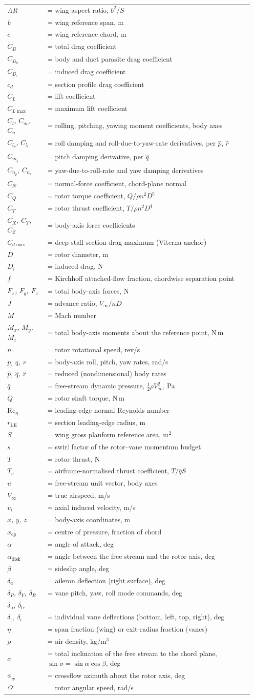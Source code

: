 \documentclass[11pt,a4paper]{article}
\newcommand{\nomen}[2]{\textit{#1} & \quad #2 \\}
\begin{document}
\begin{longtable}{@{}p{28mm}@{}p{112mm}@{}}
\nomen{A\!R}{= wing aspect ratio, $b^2/S$}
\nomen{b}{= wing reference span, m}
\nomen{$\bar c$}{= wing reference chord, m}
\nomen{$C_D$}{= total drag coefficient}
\nomen{$C_{D_0}$}{= body and duct parasite drag coefficient}
\nomen{$C_{D_i}$}{= induced drag coefficient}
\nomen{$c_d$}{= section profile drag coefficient}
\nomen{$C_L$}{= lift coefficient}
\nomen{$C_{L\max}$}{= maximum lift coefficient}
\nomen{$C_l$, $C_m$, $C_n$}{= rolling, pitching, yawing moment coefficients, body axes}
\nomen{$C_{l_p}$, $C_{l_r}$}{= roll damping and roll-due-to-yaw-rate derivatives, per $\hat p$, $\hat r$}
\nomen{$C_{m_q}$}{= pitch damping derivative, per $\hat q$}
\nomen{$C_{n_p}$, $C_{n_r}$}{= yaw-due-to-roll-rate and yaw damping derivatives}
\nomen{$C_N$}{= normal-force coefficient, chord-plane normal}
\nomen{$C_Q$}{= rotor torque coefficient, $Q/\rho n^2 D^5$}
\nomen{$C_T$}{= rotor thrust coefficient, $T/\rho n^2 D^4$}
\nomen{$C_X$, $C_Y$, $C_Z$}{= body-axis force coefficients}
\nomen{$C_{d\max}$}{= deep-stall section drag maximum (Viterna anchor)}
\nomen{$D$}{= rotor diameter, m}
\nomen{$D_i$}{= induced drag, N}
\nomen{$f$}{= Kirchhoff attached-flow fraction, chordwise separation point}
\nomen{$F_x$, $F_y$, $F_z$}{= total body-axis forces, N}
\nomen{$J$}{= advance ratio, $V_\infty/nD$}
\nomen{$M$}{= Mach number}
\nomen{$M_x$, $M_y$, $M_z$}{= total body-axis moments about the reference point, N\,m}
\nomen{$n$}{= rotor rotational speed, rev/s}
\nomen{$p$, $q$, $r$}{= body-axis roll, pitch, yaw rates, rad/s}
\nomen{$\hat p$, $\hat q$, $\hat r$}{= reduced (nondimensional) body rates}
\nomen{$\bar q$}{= free-stream dynamic pressure, $\tfrac12 \rho V_\infty^2$, Pa}
\nomen{$Q$}{= rotor shaft torque, N\,m}
\nomen{$\mathrm{Re}_n$}{= leading-edge-normal Reynolds number}
\nomen{$r_{\mathrm{LE}}$}{= section leading-edge radius, m}
\nomen{$S$}{= wing gross planform reference area, m$^2$}
\nomen{$s$}{= swirl factor of the rotor--vane momentum budget}
\nomen{$T$}{= rotor thrust, N}
\nomen{$T_c$}{= airframe-normalised thrust coefficient, $T/\bar q S$}
\nomen{$\hat u$}{= free-stream unit vector, body axes}
\nomen{$V_\infty$}{= true airspeed, m/s}
\nomen{$v_i$}{= axial induced velocity, m/s}
\nomen{$x$, $y$, $z$}{= body-axis coordinates, m}
\nomen{$x_{\mathrm{cp}}$}{= centre of pressure, fraction of chord}
\nomen{$\alpha$}{= angle of attack, deg}
\nomen{$\alpha_{\mathrm{disk}}$}{= angle between the free stream and the rotor axis, deg}
\nomen{$\beta$}{= sideslip angle, deg}
\nomen{$\delta_a$}{= aileron deflection (right surface), deg}
\nomen{$\delta_P$, $\delta_Y$, $\delta_R$}{= vane pitch, yaw, roll mode commands, deg}
\nomen{$\delta_{\mathrm{b}}$, $\delta_{\mathrm{l}}$,}{}
\nomen{$\delta_{\mathrm{t}}$, $\delta_{\mathrm{r}}$}{= individual vane deflections (bottom, left, top, right), deg}
\nomen{$\eta$}{= span fraction (wing) or exit-radius fraction (vanes)}
\nomen{$\rho$}{= air density, kg/m$^3$}
\nomen{$\sigma$}{= total inclination of the free stream to the chord plane, $\sin\sigma = \sin\alpha\cos\beta$, deg}
\nomen{$\phi_w$}{= crossflow azimuth about the rotor axis, deg}
\nomen{$\Omega$}{= rotor angular speed, rad/s}
\end{longtable}
\end{document}
